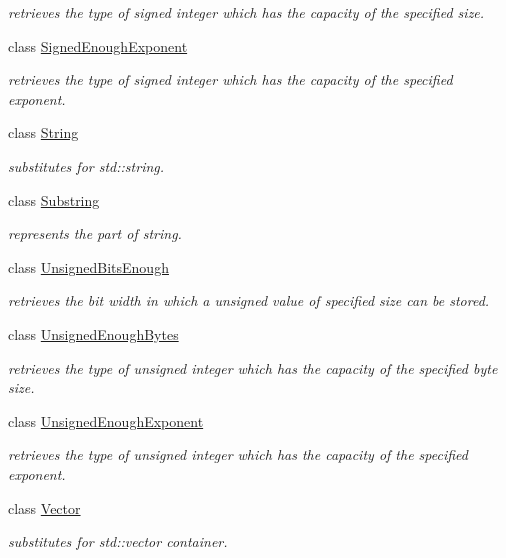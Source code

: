 \begin{DoxyCompactItemize}
\begin{DoxyCompactList}\small\item\em retrieves the type of signed integer which has the capacity of the specified size. \end{DoxyCompactList}\item 
class \hyperlink{classhryky_1_1_signed_enough_exponent}{Signed\-Enough\-Exponent}
\begin{DoxyCompactList}\small\item\em retrieves the type of signed integer which has the capacity of the specified exponent. \end{DoxyCompactList}\item 
class \hyperlink{classhryky_1_1_string}{String}
\begin{DoxyCompactList}\small\item\em substitutes for std\-::string. \end{DoxyCompactList}\item 
class \hyperlink{classhryky_1_1_substring}{Substring}
\begin{DoxyCompactList}\small\item\em represents the part of string. \end{DoxyCompactList}\item 
class \hyperlink{classhryky_1_1_unsigned_bits_enough}{Unsigned\-Bits\-Enough}
\begin{DoxyCompactList}\small\item\em retrieves the bit width in which a unsigned value of specified size can be stored. \end{DoxyCompactList}\item 
class \hyperlink{classhryky_1_1_unsigned_enough_bytes}{Unsigned\-Enough\-Bytes}
\begin{DoxyCompactList}\small\item\em retrieves the type of unsigned integer which has the capacity of the specified byte size. \end{DoxyCompactList}\item 
class \hyperlink{classhryky_1_1_unsigned_enough_exponent}{Unsigned\-Enough\-Exponent}
\begin{DoxyCompactList}\small\item\em retrieves the type of unsigned integer which has the capacity of the specified exponent. \end{DoxyCompactList}\item 
class \hyperlink{classhryky_1_1_vector}{Vector}
\begin{DoxyCompactList}\small\item\em substitutes for std\-::vector container. \end{DoxyCompactList}\end{DoxyCompactItemize}
